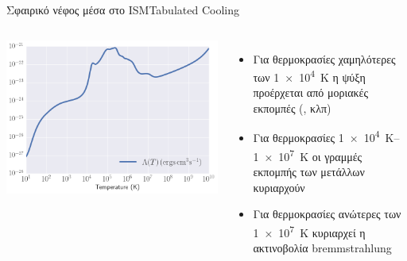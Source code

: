\documentclass{beamer}
\begin{document}
\begin{frame}{Σφαιρικό νέφος μέσα στο ISM}{Tabulated Cooling}
%	
\begin{columns}
	\begin{center}
		\includegraphics[width=1\linewidth]{../Document/Images/LambdaT}
	\end{center}
	\begin{itemize}
		\item{Για θερμοκρασίες χαμηλότερες των \SI{1e4}{K} η ψύξη προέρχεται από μοριακές εκπομπές (, κλπ)}
		\item{Για θερμοκρασίες \SIrange{1e4}{1e7}{K} οι γραμμές εκπομπής των μετάλλων κυριαρχούν}
		\item{Για θερμοκρασίες ανώτερες των \SI{1e7}{K} κυριαρχεί η ακτινοβολία bremmstrahlung}
	\end{itemize}
\end{columns}
\end{frame}
\end{document}
